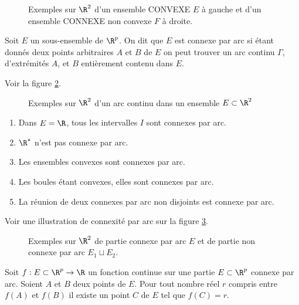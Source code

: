 \documentclass[class=report,crop=false]{standalone}
\begin{document}
 \begin{figure}[!h]
    \caption{Exemples sur $\R^2$ d'un ensemble CONVEXE $E$ à gauche et d'un ensemble CONNEXE non convexe $F$ à droite.}
      \label{fig:convexe}
\end{figure}

\begin{definition}
\textcolor[rgb]{0.73,0.00,0.00}{
\noindent Soit $E$ un sous-ensemble de $\R^p$. On dit que $E$ est connexe par arc
si étant donnés deux points arbitraires $A$ et $B$ de $E$ on peut trouver un arc continu $\Gamma$, d'extrémités $A$, et $B$ entièrement contenu dans $E$.
}
\end{definition}

\begin{exemple} \textcolor[rgb]{0.00,0.59,0.00}
{Voir la figure \ref{fig:arc}.
}
\end{exemple}

 \begin{figure}[!h]
    \caption{Exemples sur $\R^2$ d'un arc continu dans un ensemble $E \subset \R^2$}
      \label{fig:arc}
\end{figure}

\begin{exemple} \textcolor[rgb]{0.00,0.59,0.00}
{\begin{enumerate}
\item Dans $E=\R$, tous les intervalles $I$ sont connexes par arc.
\item  $\R^*$ n'est pas connexe par arc.
\item Les ensembles convexes sont connexes par arc.
\item Les boules étant convexes, elles sont connexes par arc.
\item La réunion de deux connexes  par arc non disjoints est connexe par arc.
\end{enumerate}
Voir une illustration de connexité par arc sur  la figure \ref{fig:connexe}.
}
\end{exemple}

 \begin{figure}[!h]
    \caption{Exemples sur $\R^2$ de partie connexe par arc $E$ et de partie non connexe par arc $E_1 \sqcup E_2$.}
      \label{fig:connexe}
\end{figure}


\begin{theoreme}
\textcolor[rgb]{0.50,0.00,0.25}{
Soit $f: E \subset \R^p \rightarrow \R$ un fonction continue sur une partie $E \subset \R^p$
connexe par arc. Soient $A$ et $B$ deux points de $E$. Pour tout nombre réel $r$ compris
entre $f(A)$ et $f(B)$ il existe un point $C$ de $E$ tel que $f(C)=r$. 
}
\end{theoreme}
\end{document}
